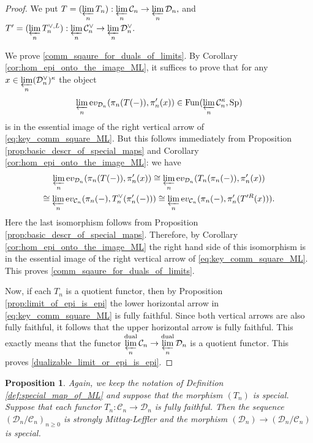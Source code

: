 \documentclass[11pt,leqno]{amsart}
\newtheorem{prop}[theo]{Proposition}
\numberwithin{equation}{section}
\newcommand{\prolim}[1][]{\mathop{\varprojlim}\limits_{#1}}
\newcommand{\dual}{\operatorname{dual}}
\newcommand{\ev}{\mathrm ev}
\newcommand{\cD}{{\mathcal D}}
\newcommand{\cC}{{\mathcal C}}
\newcommand{\Fun}{\operatorname{Fun}}
\newcommand{\Sp}{\operatorname{Sp}}
\begin{document}
\begin{proof}
We put $T=(\prolim[n]T_n):\prolim[n]\cC_n\to\prolim[n]\cD_n,$ and $T^\prime=(\prolim[n]T_n^{\vee,L}):\prolim[n]\cC_n^{\vee}\to\prolim[n]\cD_n^{\vee}.$

We prove \ref{comm_sqaure_for_duals_of_limits}. By Corollary \ref{cor:hom_epi_onto_the_image_ML}, it suffices to prove that for any $x\in\prolim[n](\cD_n^{\vee})^{\kappa}$ the object
\begin{equation*}
\prolim[n]\ev_{\cD_n}(\pi_n(T(-)),\pi_n^\prime(x))\in \Fun(\prolim[n]\cC_n^{\kappa},\Sp)
\end{equation*}
is in the essential image of the right vertical arrow of \eqref{eq:key_comm_square_ML}. But this follows immediately from Proposition \ref{prop:basic_descr_of_special_maps} and Corollary \ref{cor:hom_epi_onto_the_image_ML}: we have
\begin{multline*}
\prolim[n]\ev_{\cD_n}(\pi_n(T(-)),\pi_n^\prime(x))\cong \prolim[n]\ev_{\cD_n}(T_n(\pi_n(-)),\pi_n^\prime(x))\\ \cong\prolim[n]\ev_{\cC_n}(\pi_n(-),T_n^{\vee}(\pi_n^\prime(-)))\cong\prolim[n]\ev_{\cC_n}(\pi_n(-),\pi_n^\prime(T^{\prime R}(x))).
\end{multline*}
Here the last isomorphism follows from Proposition \ref{prop:basic_descr_of_special_maps}. Therefore, by Corollary \ref{cor:hom_epi_onto_the_image_ML} the right hand side of this isomorphism is in the essential image of the right vertical arrow of \eqref{eq:key_comm_square_ML}. This proves \ref{comm_sqaure_for_duals_of_limits}.

Now, if each $T_n$ is a quotient functor, then by Proposition \ref{prop:limit_of_epi_is_epi} the lower horizontal arrow in \eqref{eq:key_comm_square_ML} is fully faithful. Since both vertical arrows are also fully faithful, it follows that the upper horizontal arrow is fully faithful. This exactly means that the functor $\prolim[n]^{\dual}\cC_n\to\prolim[n]^{\dual}\cD_n$ is a quotient functor. This proves \ref{dualizable_limit_or_epi_is_epi}.
\end{proof}

\begin{prop}\label{prop:cokernel_of_special_mono}
Again, we keep the notation of Definition \ref{def:special_map_of_ML} and suppose that the morphism $(T_n)$ is special. Suppose that each functor $T_n:\cC_n\to\cD_n$ is fully faithful. Then the sequence $(\cD_n/\cC_n)_{n\geq 0}$ is strongly Mittag-Leffler and the morphism $(\cD_n)\to (\cD_n/\cC_n)$ is special.
\end{prop}
\end{document}
